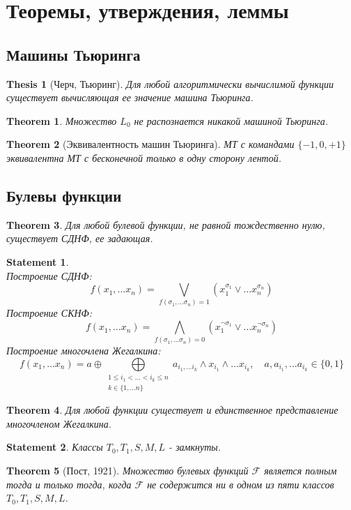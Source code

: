 \documentclass[12pt]{article}
\begin{document}
\theoremstyle{plain}
\newtheorem{thm}{Theorem}[section]
\newtheorem*{thesis}{Thesis}[section]
\newtheorem{lm}{Lemma}
\newtheorem{st}{Statement}

\theoremstyle{definition}
\newtheorem{defn}{Def.}
\newtheorem{cor}{Corollary}

\newcommand{\N}{\mathbb{N}}

\section{Теоремы, утверждения, леммы}
\subsection{Машины Тьюринга}
\begin{thesis}[Черч, Тьюринг]
    Для любой алгоритмически вычислимой функции существует вычисляющая ее значение машина Тьюринга.
\end{thesis}
\begin{thm}
    Множество $L_0$ не распознается никакой машиной Тьюринга.
\end{thm}
\begin{thm}[Эквивалентность машин Тьюринга]
    МТ с командами $\{-1, 0, +1\}$ эквивалентна МТ с бесконечной только в одну сторону лентой.
\end{thm}

\subsection{Булевы функции}
\begin{thm}
    Для любой булевой функции, не равной тождественно нулю, существует СДНФ, ее задающая.
\end{thm}
\begin{st}$ $\\
    Построение СДНФ: $$f(x_1, \ldots x_n) = \bigvee\limits_{f(\sigma_1, \ldots \sigma _n) = 1} (x_1^{ \sigma_1} \vee \ldots x_n^{ \sigma _n})	$$
    Построение СКНФ: $$f(x_1, \ldots x_n) = \bigwedge\limits_{f(\sigma_1, \ldots \sigma _n) = 0} (x_1^{\neg \sigma_1} \vee \ldots x_n^{\neg \sigma _n})	$$
    Построение многочлена Жегалкина: $$f(x_1, \ldots x_n) =a \oplus \bigoplus\limits_{
	\begin{array}{c}
	    1 \le i_1 < \ldots < i_k \le n \\
	    k \in \{ 1, \ldots n \}
	\end{array}}
	a_{i_1, \ldots i_k} \wedge x_{i_1} \wedge \ldots x_{i_k}, \quad a, a_{i_1}, \ldots a_{i_k} \in \{0, 1\}$$
\end{st}
\begin{thm}
    Для любой функции существует и единственное представление многочленом Жегалкина.
\end{thm}
\begin{st}
    Классы $T_0, T_1, S, M, L$ - замкнуты.
\end{st}
\begin{thm}[Пост, 1921]
    Множество булевых функций $\mathcal{F}$ является полным тогда и только тогда, когда $\mathcal{F}$ не содержится ни в одном из пяти классов $T_0, T_1, S, M, L$.
\end{thm}
\end{document}
